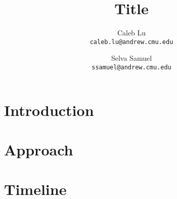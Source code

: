 \documentclass[11pt]{article}
\title{Title}
\author{
	Caleb Lu \\
	{\tt caleb.lu@andrew.cmu.edu}
	\and
	Selva Samuel \\
	{\tt ssamuel@andrew.cmu.edu}
}
\date{}
\begin{document}
\maketitle

\section{Introduction}

\section{Approach}

\section{Timeline}
\end{document}
